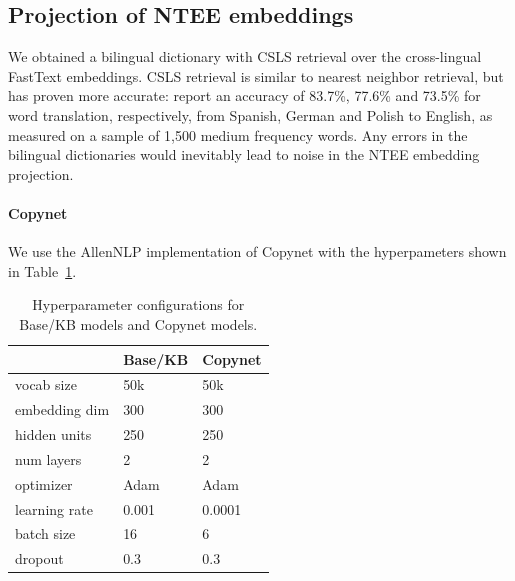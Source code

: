 \subsection{Projection of NTEE embeddings}
\label{projection}
We obtained a bilingual dictionary with CSLS retrieval over the cross-lingual FastText embeddings. CSLS retrieval is similar to nearest neighbor retrieval, but has proven more accurate: \cite{joulin-etal-2018-loss} report an accuracy of 83.7\%, 77.6\% and 73.5\% for word translation, respectively, from Spanish, German and Polish to English, as measured on a sample of 1,500 medium frequency words. Any errors in the bilingual dictionaries would inevitably lead to noise in the NTEE embedding projection.

\paragraph{Copynet}
We use the AllenNLP \cite{Gardner2017AllenNLP} implementation of Copynet with the hyperpameters shown in  Table~\ref{tab:hps}.

\begin{table}[]
    \centering
    \small
    \begin{tabular}{lll}
         &  Base/KB & Copynet \\
         \hline
         vocab size & 50k & 50k \\
         embedding dim & 300 & 300 \\
         hidden units & 250 & 250 \\
         num layers & 2 & 2 \\
         optimizer & Adam & Adam \\
         learning rate & 0.001 & 0.0001 \\
         batch size & 16 & 6 \\
         dropout & 0.3 & 0.3 \\

    \end{tabular}
    \caption{Hyperparameter configurations for Base/KB models and Copynet models.}
    \label{tab:hps}
\end{table}

